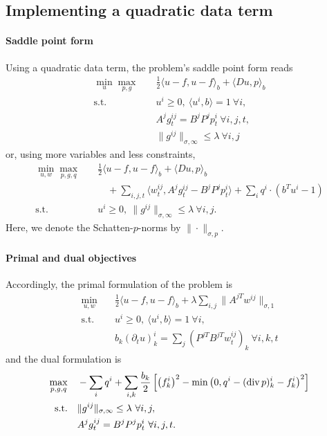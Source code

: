 
\subsection{Implementing a quadratic data term}

\paragraph{Saddle point form}

Using a quadratic data term, the problem's saddle point form reads
\begin{align*}
    \min_{u} \max_{p,g} \quad
        & \frac{1}{2} \langle u-f, u-f \rangle_b + \langle Du, p \rangle_b \\
    \text{s.t.}\quad 
        & u^i \geq 0, ~\langle u^i, b \rangle = 1 ~\forall i, \\
        & A^j g^{ij}_t = B^j P^j p^i_t ~\forall i,j,t, \\
        & \|g^{ij}\|_{\sigma,\infty} \leq \lambda ~\forall i,j
\end{align*}
or, using more variables and less constraints,
\begin{align*}
    \min_{u,w} \max_{p,g,q} \quad
        & \frac{1}{2} \langle u-f, u-f \rangle_b
            + \langle Du, p \rangle_b \\
        &\quad + \sum_{i,j,t} \langle w^{ij}_t, A^j g^{ij}_t - B^j P^j p^i_t \rangle
            + \sum_{i} q^i \cdot (b^T u^i - 1) \\
    \text{s.t.}\quad 
        & u^i \geq 0, ~\|g^{ij}\|_{\sigma,\infty} \leq \lambda ~\forall i,j.
\end{align*}
Here, we denote the Schatten-$p$-norms by $\|\cdot\|_{\sigma,p}$.

\paragraph{Primal and dual objectives}

Accordingly, the primal formulation of the problem is
\begin{align*}
    \min_{u,w} \quad
        & \frac{1}{2} \langle u-f, u-f \rangle_b 
            + \lambda \sum_{i,j} \| A^{jT} w^{ij} \|_{\sigma,1} \\
    \text{s.t.}\quad 
        & u^i \geq 0, ~\langle u^i, b \rangle = 1 ~\forall i, \\
        & b_k (\partial_t u)_k^i = \sum_j (P^{jT}B^{jT}w^{ij}_t)_{k} ~\forall i,k,t
\end{align*}
and the dual formulation is
\begin{align*}
    \max_{p,g,q} \quad
        & -\sum_i q^i
            + \sum_{i,k} \frac{b_k}{2} \left [
                \left(f_k^i\right)^2
                - \min\left(0, q^i - (\operatorname{div}{p})_k^i - f_k^i\right)^2
            \right ] \\
    \text{s.t.}\quad 
        & \|g^{ij}\|_{\sigma,\infty} \leq \lambda ~\forall i,j, \\
        & A^j g^{ij}_t = B^j P^j p^i_t ~\forall i,j,t.
\end{align*}

